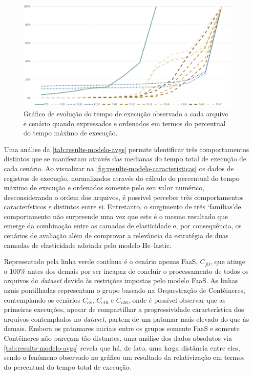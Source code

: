 \documentclass[english,brazilian]{UNISINOSmonografia} %
\newcommand\defaultFigureWidth{0.9}
\begin{document}
\begin{figure}[bt]
	\centering%
	\begin{minipage}{\defaultFigureWidth\textwidth}
		\caption{Gráfico de evolução do tempo de execução observado a cada arquivo e cenário quando expressados e ordenados em termos do percentual do tempo máximo de execução.}
		\label{fig:results-modelo-caracteristicas}
		\vspace{1ex}
		\includegraphics[width=\textwidth]{results-modelo-caracteristicas}
	\end{minipage}
\end{figure}


Uma análise da \autoref{tab:results-modelo-avgs} permite identificar três comportamentos distintos que se manifestam através das medianas do tempo total de execução de cada cenário.
%
Ao visualizar na \autoref{fig:results-modelo-caracteristicas} os dados de registros de execução, normalizados através do cálculo do percentual do tempo máximo de execução e ordenados somente pelo seu valor numérico, desconsiderando o ordem dos arquivos, é possível perceber três comportamentos característicos e distintos entre si.
%
Entretanto, o surgimento de três \textquoteleft famílias\textquoteright de comportamento não surpreende uma vez que este é o mesmo resultado que emerge da combinação entre as camadas de elasticidade e, por consequência, os cenários de avaliação além de comprovar a relevância da estratégia de duas camadas de elasticidade adotada pelo modelo \textsf{He}--lastic.



Representado pela linha verde contínua é o cenário apenas FaaS, $C_{f0}$, que atinge o 100\% antes dos demais por ser incapaz de concluir o processamento de todos os arquivos do \textit{dataset} devido às restrições impostas pelo modelo FaaS.
%
As linhas azuis pontilhadas representam o grupo baseado na Orquestração de Contêineres, contemplando os cenários {$C_{c8}$, $C_{c16}$ e $C_{c36}$}, onde é possível observar que as primeiras execuções, apesar de compartilhar a progressividade característica dos arquivos contemplados no \textit{dataset}, partem de um patamar mais elevado do que às demais.
%
Embora os patamares iniciais entre os grupos somente FaaS e somente Contêineres não pareçam tão distantes, uma análise dos dados absolutos via \autoref{tab:results-modelo-avgs} revela que há, de fato, uma larga distância entre eles, sendo o fenômeno observado no gráfico um resultado da relativização em termos do percentual do tempo total de execução.
\end{document}
